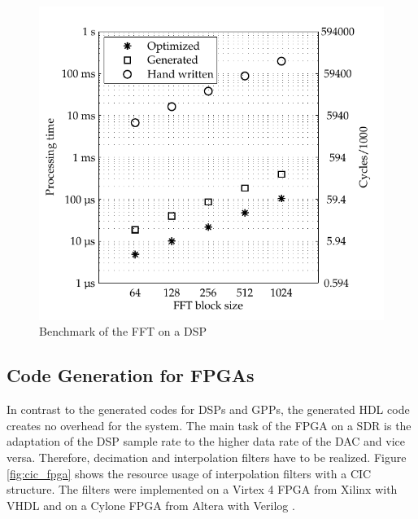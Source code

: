 \begin{figure}[htbp]
	\centering
		\includegraphics{../kapitel02/figures/fft_dsp.pdf}
	\caption{Benchmark of the FFT on a DSP}
	\label{fig:fft_dsp}
\end{figure}


\subsection{Code Generation for FPGAs}

In contrast to the generated codes for \acp{DSP} and \acp{GPP}, the generated \ac{HDL} code creates no overhead for the system. The main task of the \ac{FPGA} on a \ac{SDR} is the adaptation of the DSP sample rate to the higher data rate of the \ac{DAC} and vice versa. Therefore, decimation and interpolation filters have to be realized. Figure \ref{fig:cic_fpga} shows the resource usage of interpolation filters with a \ac{CIC} structure. The filters were implemented on a Virtex 4 FPGA from Xilinx with \acs{VHDL} \cite{virtex4} and on a Cylone FPGA from Altera with Verilog \cite{cyclone2}.

